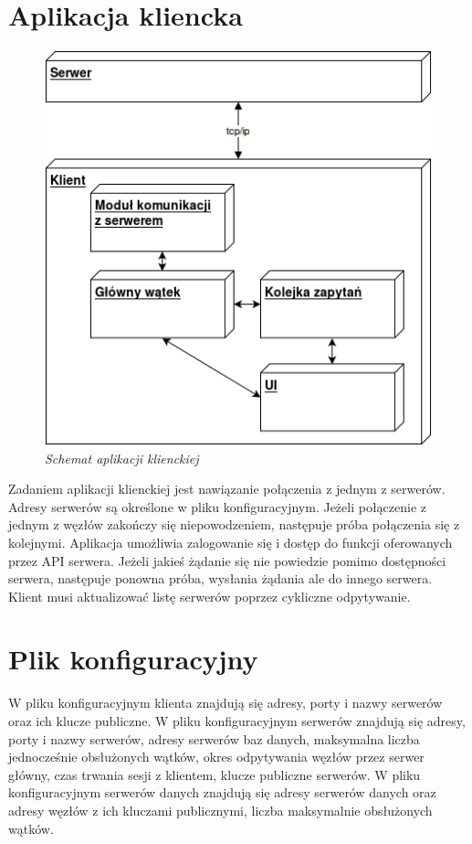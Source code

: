 \section{Aplikacja kliencka}

\begin{figure}[!h]
    \begin{center}
    \includegraphics[angle=0,scale=0.8]{img/client.png}
    \end{center}
    \caption{\em Schemat aplikacji klienckiej}
    \label{fig:client}
\end{figure}

Zadaniem aplikacji klienckiej jest nawiązanie połączenia z jednym z serwerów. Adresy serwerów są określone w pliku konfiguracyjnym. Jeżeli połączenie z jednym z węzłów zakończy się niepowodzeniem, następuje próba połączenia się z kolejnymi. Aplikacja umożliwia zalogowanie się i dostęp do funkcji oferowanych przez API serwera. Jeżeli jakieś żądanie się nie powiedzie pomimo dostępności serwera, następuje ponowna próba, wysłania żądania ale do innego serwera.
Klient musi aktualizować listę serwerów poprzez cykliczne odpytywanie.

\section{Plik konfiguracyjny}

W pliku konfiguracyjnym klienta znajdują się adresy, porty i nazwy serwerów oraz ich klucze publiczne.
W pliku konfiguracyjnym serwerów znajdują się adresy, porty i nazwy serwerów, adresy serwerów baz danych, maksymalna liczba jednocześnie obsłużonych wątków, okres odpytywania węzłów przez serwer główny, czas trwania sesji z klientem, klucze publiczne serwerów.
W pliku konfiguracyjnym serwerów danych znajdują się adresy serwerów danych oraz adresy węzłów z ich kluczami publicznymi, liczba maksymalnie obsłużonych wątków.
